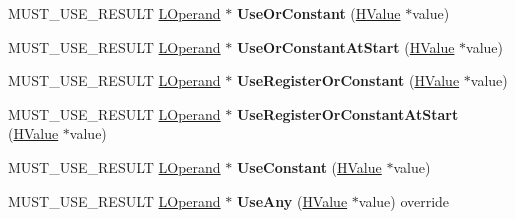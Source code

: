 \begin{DoxyCompactItemize}
\item 
M\+U\+S\+T\+\_\+\+U\+S\+E\+\_\+\+R\+E\+S\+U\+LT \hyperlink{classv8_1_1internal_1_1_l_operand}{L\+Operand} $\ast$ {\bfseries Use\+Or\+Constant} (\hyperlink{classv8_1_1internal_1_1_h_value}{H\+Value} $\ast$value)\hypertarget{classv8_1_1internal_1_1_l_chunk_builder_a5607415776a13456e36fa5ba92b8dcdd}{}\label{classv8_1_1internal_1_1_l_chunk_builder_a5607415776a13456e36fa5ba92b8dcdd}

\item 
M\+U\+S\+T\+\_\+\+U\+S\+E\+\_\+\+R\+E\+S\+U\+LT \hyperlink{classv8_1_1internal_1_1_l_operand}{L\+Operand} $\ast$ {\bfseries Use\+Or\+Constant\+At\+Start} (\hyperlink{classv8_1_1internal_1_1_h_value}{H\+Value} $\ast$value)\hypertarget{classv8_1_1internal_1_1_l_chunk_builder_a5338ef34c47b58207b22fd5a66807f85}{}\label{classv8_1_1internal_1_1_l_chunk_builder_a5338ef34c47b58207b22fd5a66807f85}

\item 
M\+U\+S\+T\+\_\+\+U\+S\+E\+\_\+\+R\+E\+S\+U\+LT \hyperlink{classv8_1_1internal_1_1_l_operand}{L\+Operand} $\ast$ {\bfseries Use\+Register\+Or\+Constant} (\hyperlink{classv8_1_1internal_1_1_h_value}{H\+Value} $\ast$value)\hypertarget{classv8_1_1internal_1_1_l_chunk_builder_aace121601a2caa8e6684cc5d5963f0df}{}\label{classv8_1_1internal_1_1_l_chunk_builder_aace121601a2caa8e6684cc5d5963f0df}

\item 
M\+U\+S\+T\+\_\+\+U\+S\+E\+\_\+\+R\+E\+S\+U\+LT \hyperlink{classv8_1_1internal_1_1_l_operand}{L\+Operand} $\ast$ {\bfseries Use\+Register\+Or\+Constant\+At\+Start} (\hyperlink{classv8_1_1internal_1_1_h_value}{H\+Value} $\ast$value)\hypertarget{classv8_1_1internal_1_1_l_chunk_builder_a14ca10ac408e3ec8501d2875ddf606fc}{}\label{classv8_1_1internal_1_1_l_chunk_builder_a14ca10ac408e3ec8501d2875ddf606fc}

\item 
M\+U\+S\+T\+\_\+\+U\+S\+E\+\_\+\+R\+E\+S\+U\+LT \hyperlink{classv8_1_1internal_1_1_l_operand}{L\+Operand} $\ast$ {\bfseries Use\+Constant} (\hyperlink{classv8_1_1internal_1_1_h_value}{H\+Value} $\ast$value)\hypertarget{classv8_1_1internal_1_1_l_chunk_builder_a6985436610071c802b9a670ae3f60700}{}\label{classv8_1_1internal_1_1_l_chunk_builder_a6985436610071c802b9a670ae3f60700}

\item 
M\+U\+S\+T\+\_\+\+U\+S\+E\+\_\+\+R\+E\+S\+U\+LT \hyperlink{classv8_1_1internal_1_1_l_operand}{L\+Operand} $\ast$ {\bfseries Use\+Any} (\hyperlink{classv8_1_1internal_1_1_h_value}{H\+Value} $\ast$value) override\hypertarget{classv8_1_1internal_1_1_l_chunk_builder_a61cb5c69ba1d82ff575d5d84ff6d1721}{}\label{classv8_1_1internal_1_1_l_chunk_builder_a61cb5c69ba1d82ff575d5d84ff6d1721}


\end{DoxyCompactItemize}
